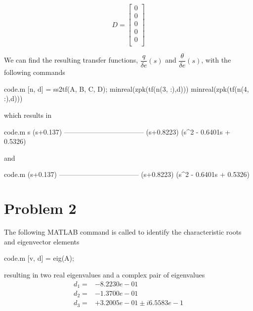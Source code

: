 \documentclass[12pt]{article}
\begin{document}
\begin{equation*}
D =
\begin{bmatrix}
      0 \\
      0 \\
      0 \\
      0 \\
      0 \\
\end{bmatrix}
\end{equation*}

\noindent We can find the resulting transfer functions, $\dfrac{q}{\delta e} (s)$ and $\dfrac{\theta}{\delta e} (s)$, with the following commands \\

\begin{filecontents*}{code.m}
[n, d] = ss2tf(A, B, C, D);
minreal(zpk(tf(n(3, :),d))) %
minreal(zpk(tf(n(4, :),d))) %
\end{filecontents*}


\noindent which results in
\begin{filecontents*}{code.m}
              s (s+0.137)
  -----------------------------------
  (s+0.8223) (s^2 - 0.6401s + 0.5326)
\end{filecontents*}

and
\begin{filecontents*}{code.m}
               (s+0.137)
  -----------------------------------
  (s+0.8223) (s^2 - 0.6401s + 0.5326)
 
\end{filecontents*}


\section{Problem 2}
\noindent The following MATLAB command is called to identify the characteristic roots and eigenvector elements
\begin{filecontents*}{code.m}
[v, d] = eig(A);
\end{filecontents*}


\noindent resulting in two real eigenvalues and a complex pair of eigenvalues
\begin{equation*}
\begin{split}
d_1 =& -8.2230e-01 \\
d_2 =& -1.3700e-01 \\
d_3 =& +3.2005e-01 \pm i 6.5583e-1 \\
\end{split}
\end{equation*}
\end{document}
